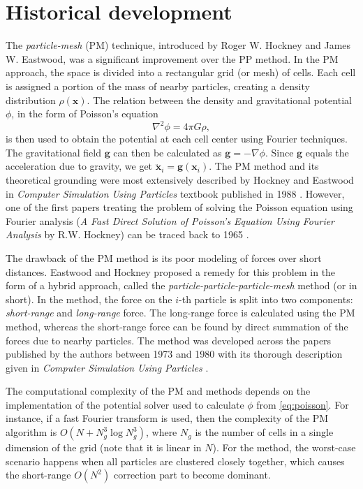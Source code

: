 \section{Historical development}\label{sec:historical-development}
The \textit{particle-mesh} (PM) technique, introduced by Roger W. Hockney and James W. Eastwood, was a significant improvement over the PP method.
In the PM approach, the space is divided into a rectangular grid (or mesh) of cells.
Each cell is assigned a portion of the mass of nearby particles, creating a density distribution $\rho(\mathbf{x})$.
The relation between the density and gravitational potential $\phi$, in the form of Poisson's equation
\begin{equation}\label{eq:poisson}
    \nabla^2\phi = 4\pi G \rho,
\end{equation}
is then used to obtain the potential at each cell center using Fourier techniques.
The gravitational field $\mathbf{g}$ can then be calculated as $\mathbf{g} = -\nabla \phi$.
Since $\mathbf{g}$ equals the acceleration due to gravity, we get $\ddot{\mathbf{x}}_i = \mathbf{g}(\mathbf{x}_i)$.
The PM method and its theoretical grounding were most extensively described by Hockney and Eastwood in \textit{Computer Simulation Using Particles} textbook published in 1988 \cite{Hockney1988}.
However, one of the first papers treating the problem of solving the Poisson equation using Fourier analysis (\textit{A Fast Direct Solution of Poisson's Equation Using Fourier Analysis} by R.W. Hockney) can be traced back to 1965 \cite{10.1145/321250.321259}.

The drawback of the PM method is its poor modeling of forces over short distances.
Eastwood and Hockney proposed a remedy for this problem in the form of a hybrid approach, called the \textit{particle-particle-particle-mesh} method (or \PThreeM{} in short).
In the \PThreeM{} method, the force on the $i$-th particle is split into two components: \textit{short-range} and \textit{long-range} force.
The long-range force is calculated using the PM method, whereas the short-range force can be found by direct summation of the forces due to nearby particles.
The \PThreeM{} method was developed across the papers published by the authors between 1973 and 1980 with its thorough description given in \textit{Computer Simulation Using Particles} \cite{Hockney1988}.

The computational complexity of the PM and \PThreeM{} methods depends on the implementation of the potential solver used to calculate $\phi$ from \autoref{eq:poisson}.
For instance, if a fast Fourier transform is used, then the complexity of the PM algorithm is $O(N + N_g^3\log N_g^3)$, where $N_g$ is the number of cells in a single dimension of the grid (note that it is linear in $N$).
For the \PThreeM{} method, the worst-case scenario happens when all particles are clustered closely together, which causes the short-range $O(N^2)$ correction part to become dominant.

